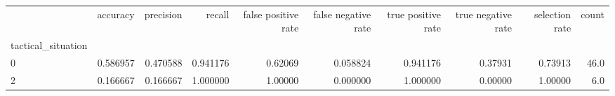 \begin{tabular}{lrrrrrrrrr}
\toprule
{} &  accuracy &  precision &    recall &  false positive rate &  false negative rate &  true positive rate &  true negative rate &  selection rate &  count \\
tactical\_situation &           &            &           &                      &                      &                     &                     &                 &        \\
\midrule
0                  &  0.586957 &   0.470588 &  0.941176 &              0.62069 &             0.058824 &            0.941176 &             0.37931 &         0.73913 &   46.0 \\
2                  &  0.166667 &   0.166667 &  1.000000 &              1.00000 &             0.000000 &            1.000000 &             0.00000 &         1.00000 &    6.0 \\
\bottomrule
\end{tabular}
